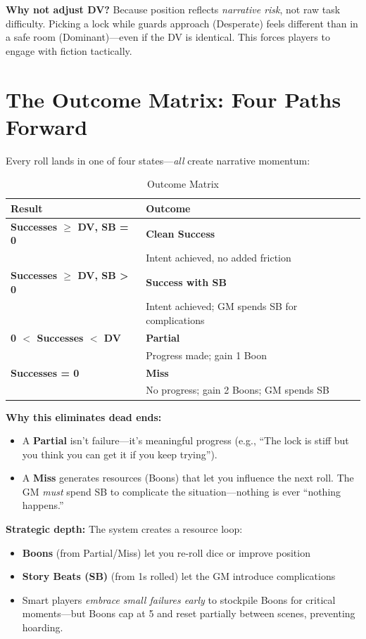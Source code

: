 \documentclass[11pt]{article}
\begin{document}
\textbf{Why not adjust DV?} Because position reflects \textit{narrative risk}, not raw task difficulty. Picking a lock while guards approach (Desperate) feels different than in a safe room (Dominant)---even if the DV is identical. This forces players to engage with fiction tactically.

\section{The Outcome Matrix: Four Paths Forward}

Every roll lands in one of four states---\textit{all} create narrative momentum:

\begin{table}[h]
\centering
\caption{Outcome Matrix}
\begin{tabular}{>{\bfseries}l l}
\toprule
Result & Outcome \\
\midrule
Successes $\geq$ DV, SB = 0 & \textbf{Clean Success} \\
& Intent achieved, no added friction \\
Successes $\geq$ DV, SB > 0 & \textbf{Success with SB} \\
& Intent achieved; GM spends SB for complications \\
0 $<$ Successes $<$ DV & \textbf{Partial} \\
& Progress made; gain 1 Boon \\
Successes = 0 & \textbf{Miss} \\
& No progress; gain 2 Boons; GM spends SB \\
\bottomrule
\end{tabular}
\end{table}

\textbf{Why this eliminates dead ends:}
\begin{itemize}
    \item A \textbf{Partial} isn't failure---it's meaningful progress (e.g., ``The lock is stiff but you think you can get it if you keep trying'').
    \item A \textbf{Miss} generates resources (Boons) that let you influence the next roll. The GM \textit{must} spend SB to complicate the situation---nothing is ever ``nothing happens.''
\end{itemize}

\textbf{Strategic depth:} The system creates a resource loop:
\begin{itemize}
    \item \textbf{Boons} (from Partial/Miss) let you re-roll dice or improve position
    \item \textbf{Story Beats (SB)} (from 1s rolled) let the GM introduce complications
    \item Smart players \textit{embrace small failures early} to stockpile Boons for critical moments---but Boons cap at 5 and reset partially between scenes, preventing hoarding.
\end{itemize}
\end{document}
